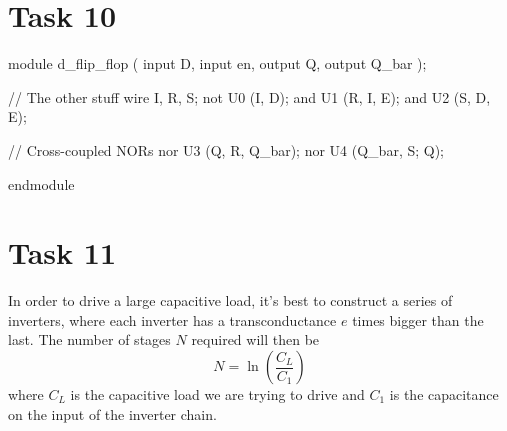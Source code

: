 \documentclass[a4paper,11pt,norsk]{article}
\begin{document}
\section*{Task 10}
\begin{codebox}[verilog]
module d_flip_flop (
    input D,
    input en,
    output Q,
    output Q_bar
);

    // The other stuff
    wire I, R, S;
    not U0 (I, D);
    and U1 (R, I, E);
    and U2 (S, D, E);

    // Cross-coupled NORs
    nor U3 (Q, R, Q_bar);
    nor U4 (Q_bar, S; Q);

endmodule
\end{codebox}

\section*{Task 11}
In order to drive a large capacitive load, it's best to construct a series of inverters, where each inverter
has a transconductance $e$ times bigger than the last. The number of stages $N$ required will then be
\[
    N = \ln{\left(\frac{C_L}{C_1}\right)}
\]
where $C_L$ is the capacitive load we are trying to drive and $C_1$ is the capacitance on the input of the 
inverter chain.
\end{document}

